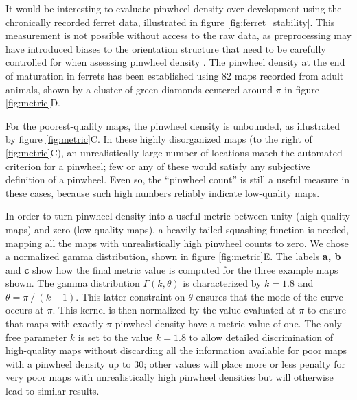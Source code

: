 \documentclass{article}
\begin{document}
It would be interesting to evaluate pinwheel density over development
using the chronically recorded ferret data, illustrated in figure
\ref{fig:ferret_stability}. This measurement is not possible without
access to the raw data, as preprocessing may have introduced biases to the
orientation structure that need to be carefully controlled for when
assessing pinwheel density \citep{Kaschube2010}. The pinwheel density
at the end of maturation in ferrets has been established using 82 maps recorded
from adult animals, shown by a cluster of green diamonds centered around
$\pi$ in figure \ref{fig:metric}D.

For the poorest-quality maps, the pinwheel density is unbounded, as
illustrated by figure \ref{fig:metric}C. In these highly
disorganized maps (to the right of \ref{fig:metric}C), an
unrealistically large number of locations match the automated
criterion for a pinwheel; few or any of these would satisfy any
subjective definition of a pinwheel.  Even so, the
``pinwheel count'' is still a useful measure in these cases, because
such high numbers reliably indicate low-quality maps.

In order to turn pinwheel density into a useful metric between unity
(high quality maps) and zero (low quality maps), a heavily tailed
squashing function is needed, mapping all the maps with
unrealistically high pinwheel counts to zero.  We chose a normalized gamma
distribution, shown in figure \ref{fig:metric}E. The labels {\bf a, b}
and {\bf c} show how the final metric value is computed for the three
example maps shown. The gamma distribution $\Gamma(k,\theta)$ is
characterized by $k=1.8$ and $\theta=\pi \mathbin{/} (k -1)$. This
latter constraint on $\theta$ ensures that the mode of the curve
occurs at $\pi$. This kernel is then normalized by the value evaluated
at $\pi$ to ensure that maps with exactly $\pi$ pinwheel density have
a metric value of one. The only free parameter $k$ is set to the value
$k=1.8$ to allow detailed discrimination of high-quality maps without
discarding all the information available for poor maps with a pinwheel
density up to 30; other values will place more or less penalty for
very poor maps with unrealistically high pinwheel densities
but will otherwise lead to similar results. 
\end{document}
